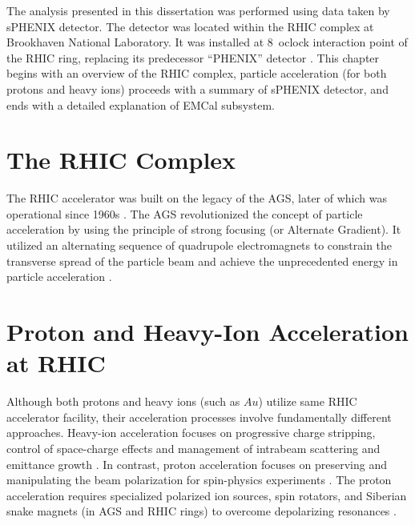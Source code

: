 
The analysis presented in this dissertation was performed using data taken by \ac{sPHENIX} detector. The detector was located within the \ac{RHIC} complex at Brookhaven National Laboratory. It was installed at 8~o\textquotesingle clock interaction point of the \ac{RHIC} ring, replacing its predecessor ``\ac{PHENIX}'' detector \cite{obrien2024sphenix, belmont2024sphenix}. This chapter begins with an overview of the \ac{RHIC} complex, particle acceleration (for both protons and heavy ions) proceeds with a summary of \ac{sPHENIX} detector, and ends with a detailed explanation of \ac{EMCal} subsystem.


\section{The RHIC Complex}

The \ac{RHIC} accelerator was built on the legacy of the \ac{AGS}, later of which was operational since 1960s \cite{harrison2003rhic, NLRP_2015}. The \ac{AGS} revolutionized the concept of particle acceleration by using the principle of strong focusing (or Alternate Gradient). It utilized an alternating sequence of quadrupole electromagnets to constrain the transverse spread of the particle beam and achieve the unprecedented energy in particle acceleration \cite{aps_bnl_hist}.

\section{Proton and Heavy-Ion Acceleration at RHIC}

Although both protons and heavy ions (such as $Au$) utilize same \ac{RHIC} accelerator facility, their acceleration processes involve fundamentally different approaches. Heavy-ion acceleration focuses on progressive charge stripping, control of space-charge effects and management of intrabeam scattering and emittance growth \cite{harrison2003rhic}. In contrast, proton acceleration focuses on preserving and manipulating the beam polarization for spin-physics experiments \cite{harrison2003rhic}. The proton acceleration requires specialized polarized ion sources, spin rotators, and Siberian snake magnets (in \ac{AGS} and \ac{RHIC} rings) to overcome depolarizing resonances \cite{harrison2003rhic}.


